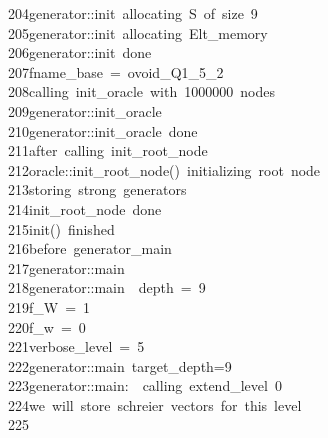 \begin{tabbing}
204\>generator::init\ allocating\ S\ of\ size\ 9\\[0pt]
205\>generator::init\ allocating\ Elt\_memory\\[0pt]
206\>generator::init\ done\\[0pt]
207\>fname\_base\ =\ ovoid\_Q1\_5\_2\\[0pt]
208\>calling\ init\_oracle\ with\ 1000000\ nodes\\[0pt]
209\>generator::init\_oracle\\[0pt]
210\>generator::init\_oracle\ done\\[0pt]
211\>after\ calling\ init\_root\_node\\[0pt]
212\>oracle::init\_root\_node()\ initializing\ root\ node\\[0pt]
213\>storing\ strong\ generators\\[0pt]
214\>init\_root\_node\ done\\[0pt]
215\>init()\ finished\\[0pt]
216\>before\ generator\_main\\[0pt]
217\>generator::main\\[0pt]
218\>generator::main\ \ depth\ =\ 9\\[0pt]
219\>f\_W\ =\ 1\\[0pt]
220\>f\_w\ =\ 0\\[0pt]
221\>verbose\_level\ =\ 5\\[0pt]
222\>generator::main\ target\_depth=9\\[0pt]
223\>generator::main:\ \ calling\ extend\_level\ 0\\[0pt]
224\>we\ will\ store\ schreier\ vectors\ for\ this\ level\\[0pt]
225\>\\[0pt]

\end{tabbing}

